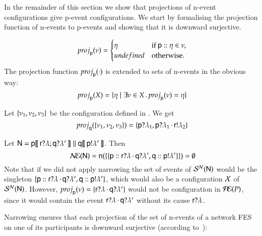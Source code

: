 In the remainder of this section we show that projections of n-event
configurations give p-event configurations. We start by formalising
the projection function of n-events to p-events and showing that it is
downward surjective.

\begin{definition}
\label{def:proj-network-n-event}
\[
{\sc proj}_{{\sf p}}(\nu)=\begin{cases}
\eta     & \text{if } {\sf p}:: \eta\in\nu, \\
 undefined   & \text{otherwise}.
\end{cases}
\]
The projection function ${\sc proj}_{{\sf p}}(\cdot)$ is extended to sets of
n-events in the obvious way:
\[
{\sc proj}_{{\sf p}}(X)  = \{ \eta \mid 
    \exists\nu \in X  \, .\, {\sc proj}_{{\sf p}}(\nu) = \eta\}
    \]
\end{definition}

\begin{example}
  Let $\{\nu_1,\nu_2,\nu_3\}$ be the configuration defined in . We get
\[
{\sc proj}_{{\sf q}}(\{\nu_1,\nu_2,\nu_3\}) =
    \{{\sf p}?\lambda_1,
      {\sf p}?\lambda_1\,{\cdot}\,{\sf r}!\lambda_2\}
      \]
\end{example}

\begin{example}
Let  ${\sf N}={\sf p}[\![\,{\sf r}?\lambda;{\sf q}?\lambda'\,]\!] \mathrel{\|} {\sf q}[\![\,{\sf p}!\lambda'\,]\!]$.  Then
\[ 
\mathcal{N\!E}({\sf N}) ={\sf n}(\{\{{\sf p}:: {\sf r}?\lambda\,{\cdot}\,{\sf q}?\lambda',{\sf q}:: {\sf p}!\lambda'\}\})=\emptyset
\]
Note that if we did not apply narrowing the set of events of 
$\mathcal{S}^{\mathcal{N}}({\sf N})$ 
would be the singleton
$\{{\sf p}:: {\sf r}?\lambda\,{\cdot}\,{\sf q}?\lambda',{\sf q}:: {\sf p}!\lambda'\}$,
which would also be a configuration $\mathcal{X}$ of $\mathcal{S}^{\mathcal{N}}({\sf N})$. However,
${\sc proj}_{{\sf p}}(\nu)=\{{\sf r}?\lambda\,{\cdot}\,{\sf q}?\lambda'\}$
would not be configuration in $\mathcal{P\!E}(P)$, since it would contain the
event ${\sf r}?\lambda\,{\cdot}\,{\sf q}?\lambda'$ without its cause
${\sf r}?\lambda$. 
\end{example}



Narrowing ensures that each projection of the set of n-events of a
network  FES  on one of its participants is downward
surjective (according to~):


